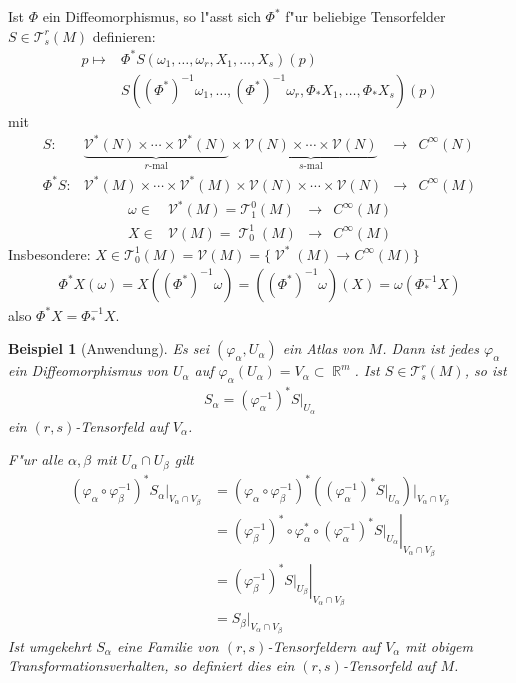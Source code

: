 \documentclass[paper=A4, twoside, chapterprefix=true, bibliography=totoc, headsepline]{scrbook}
\let\temp\phi
\let\phi\varphi
\let\varphi\temp
\let\temp\theta
\let\theta\vartheta
\let\vartheta\temp
\let\temp\epsilon
\let\epsilon\varepsilon
\let\varepsilon\temp
\let\temp\rho
\let\rho\varrho
\let\varrho\temp
\DeclareMathOperator{\R}{\mathbb{R}}
\DeclareMathOperator{\calT}{\mathcal{T}}
\DeclareMathOperator{\calV}{\mathcal{V}}
\newcommand{\X}{\times}
\theoremstyle{plain}
\theoremstyle{nonumberplain}
\newtheorem{bsp}{Beispiel}
\theoremstyle{empty}
\theoremstyle{break}
\begin{document}
Ist $\Phi$ ein Diffeomorphismus, so l"asst sich $\Phi^{*}$ f"ur beliebige Tensorfelder $S \in \mathcal T_s^r(M)$ definieren:
\begin{align*}
	p \mapsto {}& \Phi^{*}S (\omega_1,\ldots,\omega_r,X_1,\ldots,X_s)(p)\\
	& S((\Phi^{*})^{-1}\omega_1, \ldots, (\Phi^{*})^{-1}\omega_{r}, \Phi_{*}X_1,\ldots,\Phi_{*}X_s)(p)
\end{align*}
mit
	\[ \begin{array}{rccc} S \colon& \underbrace{\mathcal V^{*}(N) \X \cdots \X \mathcal V^{*}(N)}_{r\text{-mal}} \X \underbrace{ \mathcal V(N) \X \cdots \X \mathcal V(N)}_{s\text{-mal}} &\to& C^{\infty}(N)\\
		\Phi^*S \colon& \mathcal V^{*}(M) \X \cdots \X \mathcal V^{*}(M) \X \mathcal V(N) \X \cdots \X \mathcal V(N) &\to& C^{\infty}(M) \end{array} \]
	\[ \begin{array}{rccc} \omega \in & \mathcal V^{*}(M) = \mathcal T_1^0(M) &\to& C^{\infty}(M)\\
		X \in & \mathcal V(M) = \calT_0^1(M) &\to& C^{\infty}(M) \end{array} \]
Insbesondere: $X \in \mathcal T_0^1(M) = \mathcal V(M) = \{\calV^*(M) \to C^{\infty}(M)\}$
\begin{align*}
  \Phi^{*}X(\omega) = X((\Phi^{*})^{-1}\omega) = ((\Phi^{*})^{-1}\omega)(X) = \omega(\Phi_{*}^{-1}X)
\end{align*}
also $\Phi^{*}X = \Phi_{*}^{-1}X$.

\begin{bsp}[Anwendung]
  Es sei $(\phi_{\alpha},U_{\alpha})$ ein Atlas von $M$. Dann ist jedes $\phi_{\alpha}$ ein Diffeomorphismus von $U_{\alpha}$ auf $\phi_{\alpha}(U_{\alpha}) = V_{\alpha} \subset \R^m$. Ist $S \in \mathcal T_s^r(M)$, so ist
  \begin{align*}
    S_{\alpha} = (\phi_{\alpha}^{-1})^{*}S|_{U_\alpha}
  \end{align*}
  ein $(r,s)$-Tensorfeld auf $V_{\alpha}$.


  F"ur alle $\alpha, \beta$ mit $U_{\alpha} \cap U_{\beta}$ gilt
  \begin{align*}
    (\phi_{\alpha} \circ \phi_{\beta}^{-1})^{*}S_{\alpha}|_{V_{\alpha} \cap V_{\beta}} & = (\phi_{\alpha} \circ \phi_{\beta}^{-1})^{*}\left((\phi_{\alpha}^{-1})^{*}S|_{U_{\alpha}}\right)|_{V_{\alpha}\cap V_{\beta}}\\
    & = \left.(\phi_{\beta}^{-1})^{*} \circ \phi_{\alpha}^{*} \circ (\phi_{\alpha}^{-1})^{*} S|_{U_{\alpha}}\right|_{V_{\alpha} \cap V_{\beta}}\\
    & = \left.(\phi_{\beta}^{-1})^{*}S|_{U_{\beta}}\right|_{V_{\alpha} \cap V_{\beta}}\\
    & = S_{\beta}|_{V_{\alpha} \cap V_{\beta}}
  \end{align*}
  Ist umgekehrt $S_\alpha$ eine Familie von $(r,s)$-Tensorfeldern auf $V_{\alpha}$ mit obigem Transformationsverhalten, so definiert dies ein $(r,s)$-Tensorfeld auf $M$.
\end{bsp}
\end{document}
